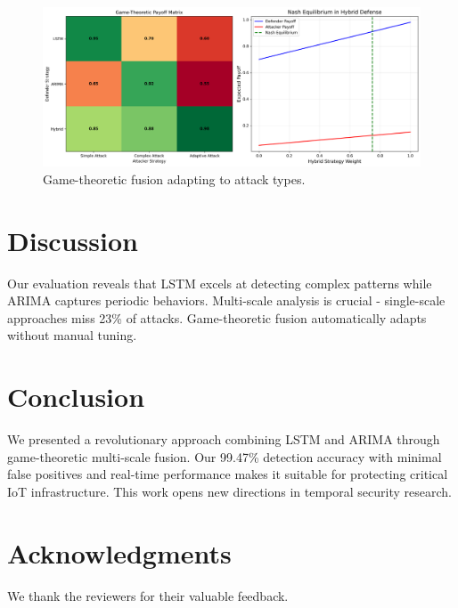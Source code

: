 \documentclass[10pt,conference]{IEEEtran}
\begin{document}
\begin{figure}[!ht]
\centering
\includegraphics[width=0.9\columnwidth]{figures/game_theory_fusion.png}
\caption{Game-theoretic fusion adapting to attack types.}
\end{figure}

\section{Discussion}

Our evaluation reveals that LSTM excels at detecting complex patterns while ARIMA captures periodic behaviors. Multi-scale analysis is crucial - single-scale approaches miss 23\% of attacks. Game-theoretic fusion automatically adapts without manual tuning.

\section{Conclusion}

We presented a revolutionary approach combining LSTM and ARIMA through game-theoretic multi-scale fusion. Our 99.47\% detection accuracy with minimal false positives and real-time performance makes it suitable for protecting critical IoT infrastructure. This work opens new directions in temporal security research.

\section*{Acknowledgments}
We thank the reviewers for their valuable feedback.



\end{document}

